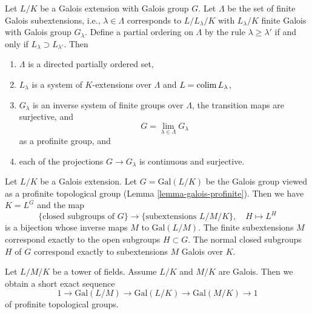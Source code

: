 \begin{lemma}\cite[\href{https://stacks.math.columbia.edu/tag/0BU2}{Lemma 0BU2}]{stacks-project}
	\label{lemma-infinite-galois-limit}
	Let $L/K$ be a Galois extension with Galois group $G$.
	Let $\Lambda$ be the set of finite Galois subextensions,
	i.e., $\lambda \in \Lambda$ corresponds to $L/L_\lambda/K$
	with $L_\lambda/K$ finite Galois with Galois group $G_\lambda$.
	Define a partial ordering on $\Lambda$ by the rule
	$\lambda \geq \lambda'$ if and only if
	$L_\lambda \supset L_{\lambda'}$. Then
	\begin{enumerate}
		\item $\Lambda$ is a directed partially ordered set,
		\item $L_\lambda$ is a system of $K$-extensions over $\Lambda$
		and $L = \mathop{\mathrm{colim}}\nolimits L_\lambda$,
		\item $G_\lambda$ is an inverse system of finite groups over $\Lambda$,
		the transition maps are surjective, and
		$$
		G = \lim_{\lambda \in \Lambda} G_\lambda
		$$
		as a profinite group, and
		\item each of the projections $G \to G_\lambda$ is continuous and surjective.
	\end{enumerate}
\end{lemma}

\begin{theorem}\cite[\href{https://stacks.math.columbia.edu/tag/0BML}{Theorem 0BML}]{stacks-project}
	\label{theorem-inifinite-galois-theory}
	Let $L/K$ be a Galois extension. Let $G = \text{Gal}(L/K)$
	be the Galois group viewed as a profinite topological group
	(Lemma \ref{lemma-galois-profinite}). Then we have $K = L^G$ and the map
	$$
	\{\text{closed subgroups of }G\}
	\longrightarrow
	\{\text{subextensions }L/M/K\},\quad
	H \longmapsto L^H
	$$
	is a bijection whose inverse maps $M$ to $\text{Gal}(L/M)$.
	The finite subextensions $M$ correspond exactly to the open
	subgroups $H \subset G$. The normal closed subgroups $H$ of $G$
	correspond exactly to subextensions $M$ Galois over $K$.
\end{theorem}

\begin{lemma}\cite[\href{https://stacks.math.columbia.edu/tag/0BMM}{Lemma 0BMM}]{stacks-project}
	\label{lemma-ses-infinite-galois}
	Let $L/M/K$ be a tower of fields. Assume $L/K$ and $M/K$ are Galois.
	Then we obtain a short exact sequence
	$$
	1 \to \text{Gal}(L/M) \to \text{Gal}(L/K) \to \text{Gal}(M/K) \to 1
	$$
	of profinite topological groups.
\end{lemma}



